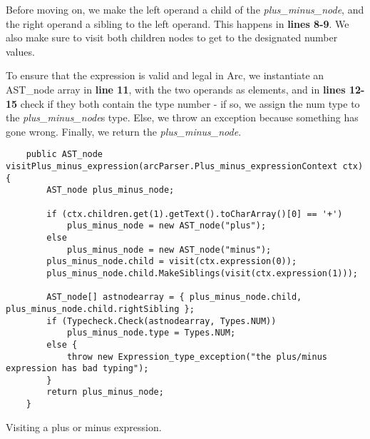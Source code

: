 Before moving on, we make the left operand a child of the \textit{plus\_minus\_node}, and the right operand a sibling to the left operand. This happens in \textbf{lines 8-9}. We also make sure to visit both children nodes to get to the designated number values.

To ensure that the expression is valid and legal in Arc, we instantiate an AST\_node array in \textbf{line 11}, with the two operands as elements, and in \textbf{lines 12-15} check if they both contain the type number - if so, we assign the num type to the \textit{plus\_minus\_node}s type. Else, we throw an exception because something has gone wrong. Finally, we return the \textit{plus\_minus\_node}.


\begin{listing}[htb!]
    \begin{verbatim}
    public AST_node visitPlus_minus_expression(arcParser.Plus_minus_expressionContext ctx) {
        AST_node plus_minus_node;

        if (ctx.children.get(1).getText().toCharArray()[0] == '+')
            plus_minus_node = new AST_node("plus");
        else
            plus_minus_node = new AST_node("minus");
        plus_minus_node.child = visit(ctx.expression(0));
        plus_minus_node.child.MakeSiblings(visit(ctx.expression(1)));

        AST_node[] astnodearray = { plus_minus_node.child, plus_minus_node.child.rightSibling };
        if (Typecheck.Check(astnodearray, Types.NUM))
            plus_minus_node.type = Types.NUM;
        else {
            throw new Expression_type_exception("the plus/minus expression has bad typing");
        }
        return plus_minus_node;
    }
    \end{verbatim}
    \caption{Visiting a plus or minus expression.}
    \label{lst:visitorplusminusexpression}
\end{listing}
